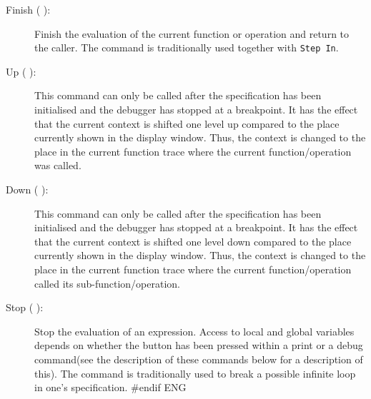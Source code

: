 \documentclass[\pformat,12pt]{article}
\newcommand{\guicmd}[1]{{\sf #1}}
\newcommand{\guicmd}[1]{{\gt #1}}
\begin{document}
\begin{description}
\item[\guicmd{Finish} (\hspace{-1.8mm}
):] 
Finish the evaluation of the current function
  or operation and return to the caller. The command is traditionally
  used together with {\tt Step In}.
  
\item[\guicmd{Up} (\hspace{-1.8mm}
):] 
This command can only be called after the
specification has been initialised and the debugger has stopped at a
breakpoint. It has the effect that the current context is shifted one
level up compared to the place currently shown in the display
window. Thus, the context is changed to the place in the current
function trace where the current function/operation was called.

\item[\guicmd{Down} (\hspace{-1.8mm}
):]
This command can only be called after the specification has been
initialised and the debugger has stopped at a breakpoint. It has the
effect that the current context is shifted one level down compared to
the place currently shown in the display window. Thus, the context is
changed to the place in the current function trace where the current
function/operation called its sub-function/operation.

\item[\guicmd{Stop} (\hspace{-1.8mm}
):] 
Stop the evaluation of an
  expression. Access to local and global variables depends on whether
  the button has been pressed within a \guicmd{print} or a
  \guicmd{debug} command(see the description of these commands below
  for a description of this). The command is traditionally
  used to break a possible infinite loop in one's specification.
#endif ENG


\end{description}
\end{document}
